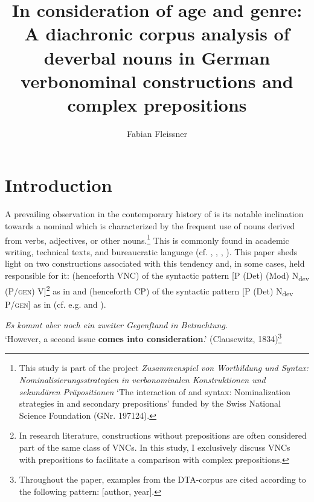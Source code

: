 \documentclass[output=paper,colorlinks,citecolor=brown]{langscibook}
\author{Fabian Fleissner\affiliation{Université de Neuchâtel}}
\title[In consideration of Age and Genre]{In consideration of age and genre: A diachronic corpus analysis of deverbal nouns in German verbonominal constructions and complex prepositions}
\begin{document}
\maketitle


\section{Introduction}\label{sec:fleissner:1}

A prevailing observation in the contemporary history of  is its notable inclination towards a nominal  which is characterized by the frequent use of nouns derived from verbs, adjectives, or other nouns.\footnote{This study is part of the project \textit{Zusammenspiel von Wortbildung und Syntax: }\textbf{}\textit{Nominalisierungsstrategien in verbonominalen Konstruktionen und sekundären Präpositionen} ‘The interaction of  and syntax: Nominalization strategies in  and secondary prepositions' funded by the Swiss National Science Foundation (GNr. 197124).} This  is commonly found in academic writing, technical texts, and bureaucratic language (cf. \citealt{Eggers1973}, \citealt{Moslein1981}, \citealt{Admoni1973, Admoni1990}, \citealt{Polenz1987, Polenz2013}). This paper sheds light on two constructions associated with this tendency and, in some cases, held responsible for it:  (henceforth VNC) of the syntactic pattern [P (Det) (Mod) N\textsubscript{dev} (P/\textsc{gen}) V]\footnote{In research literature, constructions without prepositions are often considered part of the same class of VNCs. In this study, I exclusively discuss VNCs with prepositions to facilitate a comparison with complex prepositions.}  as in  and  (henceforth CP) of the syntactic pattern [P (Det) N\textsubscript{dev} P/\textsc{gen}] as in  (cf. e.g. \citealt{SeppänenTrotta1994} and \citealt{HüningEtAl2020}). 

\ea%
\label{ex:fleissner:1}
{\itshape Es kommt aber noch ein zweiter Gegenſtand in Betrachtung.}\\
\glt ‘However, a second issue \textbf{comes into consideration}.' \hfill (Clausewitz, 1834)\footnote{Throughout the paper, examples from the DTA-corpus are cited according to the following pattern: [author, year].}
\z 
\end{document}

